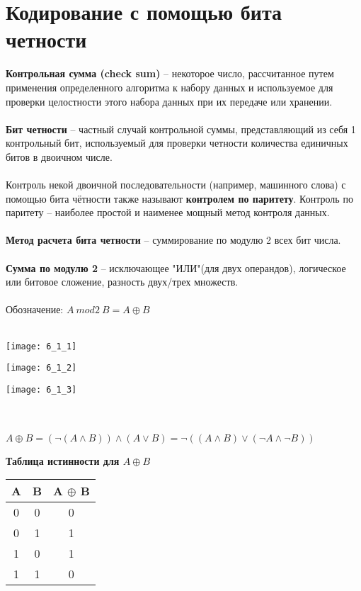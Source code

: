 \section{Кодирование с помощью бита четности}
\textbf{Контрольная сумма (check sum)} -- некоторое число, рассчитанное путем применения определенного алгоритма к набору данных и используемое для проверки целостности этого набора данных при их передаче или хранении.
\\
\\\textbf{Бит четности} -- частный случай контрольной суммы, представляющий из себя 1 контрольный бит, используемый для проверки четности количества единичных битов в двоичном числе.
\\
\\Контроль некой двоичной последовательности (например, машинного слова) с помощью бита чётности также называют \textbf{контролем по паритету}. Контроль по паритету -- наиболее простой и наименее мощный метод контроля данных.
\\
\\\textbf{Метод расчета бита четности} -- суммирование по модулю 2 всех бит числа.
\\
\\\textbf{Сумма по модулю 2} -- исключающее "ИЛИ"(для двух операндов), логическое или битовое сложение, разность двух/трех множеств.
\\
\\Обозначение: $A\ mod2\ B = A \oplus B$
\\
\\
\begin{minipage}[l]{3.5cm}
\texttt{[image: 6\_1\_1]}
\end{minipage}
\begin{minipage}[c]{3.5cm}
\texttt{[image: 6\_1\_2]}
\end{minipage}
\begin{minipage}[r]{3.5cm}
\texttt{[image: 6\_1\_3]}
\end{minipage}
\\
\\
$A \oplus B = (\neg(A\wedge B))\wedge(A\vee B) = \neg((A\wedge B)\vee(\neg A\wedge \neg B))$
\\
\begin{center}
\textbf{Таблица истинности для $A \oplus B$}
\end{center}
\begin{minipage}[l]{4cm}
\begin{tabular}{|c|c|c|}
\hline
A & B & A $\oplus$ B \\
\hline
0 & 0 & 0 \\
0 & 1 & 1 \\
1 & 0 & 1 \\
1 & 1 & 0 \\
\hline
\end{tabular}
\end{minipage}
